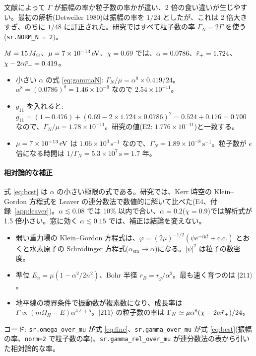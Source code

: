 \begin{caution}
文献によって $\Gamma$ が振幅の率か粒子数の率かが違い、2 倍の食い違いが生じやすい。最初の解析(Detweiler 1980)は振幅の率を $1/24$ としたが、これは 2 倍大きすぎ、のちに $1/48$ に訂正された。研究ではすべて粒子数の率 $\Gamma_N=2\Gamma$ を使う(\texttt{sr.NORM\_N = 2})。
\end{caution}

\begin{numcheck}
$M=15\,M_\odot$、$\mu=7\times10^{-13}\,\mathrm{eV}$、$\chi=0.69$ では、$\alpha=0.0786$、$\tilde r_+=1.724$、$\chi-2\alpha\tilde r_+=0.419$。
\begin{itemize}
\item 小さい $\alpha$ の式 \eqref{eq:gammaN}: $\Gamma_N/\mu=\alpha^8\times0.419/24$。$\alpha^8=(0.0786)^8=1.46\times10^{-9}$ なので $2.54\times10^{-11}$。
\item $g_{11}$ を入れると: $g_{11}=(1-0.476)+(0.69-2\times1.724\times0.0786)^2=0.524+0.176=0.700$ なので、$\Gamma_N/\mu=1.78\times10^{-11}$。研究の値(E2: $1.776\times10^{-11}$)と一致する。
\item $\mu=7\times10^{-13}\,\mathrm{eV}$ は $1.06\times10^3\,\mathrm{s}^{-1}$ なので、$\Gamma_N=1.89\times10^{-8}\,\mathrm{s}^{-1}$。粒子数が $e$ 倍になる時間は $1/\Gamma_N=5.3\times10^7\,\mathrm{s}=1.7$ 年。
\end{itemize}
\end{numcheck}

\paragraph{相対論的な補正}
式 \eqref{eq:bcst} は $\alpha$ の小さい極限の式である。研究では、Kerr 時空の Klein--Gordon 方程式を Leaver の連分数法で数値的に解いて比べた(E4、付録~\ref{app:leaver})。$\alpha\lesssim0.08$ では 10\% 以内で合い、$\alpha=0.2$($\chi=0.9$)では解析式が 1.5 倍小さい。窓に効く $\alpha\lesssim0.15$ では、補正は結論を変えない。

\begin{summary}
\begin{itemize}
\item 弱い重力場の Klein--Gordon 方程式は、$\varphi=(2\mu)^{-1/2}(\psi e^{-i\mu t}+\mathrm{c.c.})$ とおくと水素原子の Schr\"odinger 方程式($\alpha_\mathrm{em}\to\alpha$)になる。$|\psi|^2$ は粒子の数密度。
\item 準位 $E_n=\mu(1-\alpha^2/2n^2)$、Bohr 半径 $r_B=r_g/\alpha^2$。最も速く育つのは $|211\rangle$。
\item 地平線の境界条件で振動数が複素数になり、成長率は $\Gamma\propto(m\Omega_H-E)\alpha^{4\ell+5}$。$|211\rangle$ の粒子数の率は $\Gamma_N\simeq\mu\alpha^8(\chi-2\alpha\tilde r_+)/24$。
\end{itemize}
\end{summary}

\begin{tocode}
コード: \texttt{sr.omega\_over\_mu} が式 \eqref{eq:fine}、\texttt{sr.gamma\_over\_mu} が式 \eqref{eq:bcst}(振幅の率、\texttt{norm=2} で粒子数の率)、\texttt{sr.gamma\_rel\_over\_mu} が連分数法の表から引いた相対論的な率。
\end{tocode}
